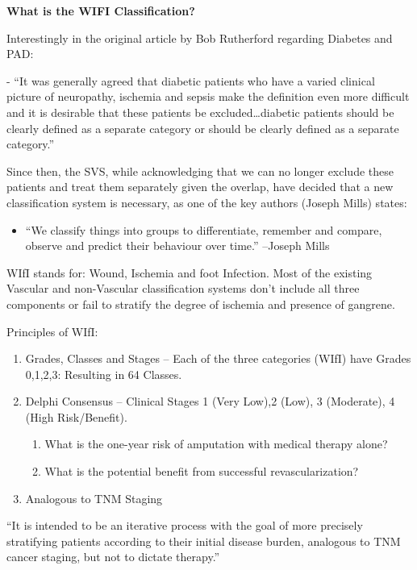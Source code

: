 \documentclass[
]{book}
\providecommand{\tightlist}{%
  \setlength{\itemsep}{0pt}\setlength{\parskip}{0pt}}
\begin{document}
\textbf{What is the WIFI Classification?} \citep{millsSocietyVascularSurgery2014a}

Interestingly in the original article by Bob Rutherford regarding
Diabetes and PAD:

- ``It was generally agreed that diabetic patients who have a varied
clinical picture of neuropathy, ischemia and sepsis make the definition
even more difficult and it is desirable that these patients be
excluded\ldots diabetic patients should be clearly defined as a separate
category or should be clearly defined as a separate category.''

Since then, the SVS, while acknowledging that we can no longer exclude
these patients and treat them separately given the overlap, have decided
that a new classification system is necessary, as one of the key authors
(Joseph Mills) states:

\begin{itemize}
\tightlist
\item
  ``We classify things into groups to differentiate, remember and
  compare, observe and predict their behaviour over time.'' --Joseph
  Mills
\end{itemize}

WIfI stands for: Wound, Ischemia and foot Infection. Most of the
existing Vascular and non-Vascular classification systems don't include
all three components or fail to stratify the degree of ischemia and
presence of gangrene.

Principles of WIfI:

\begin{enumerate}
\def\labelenumi{\arabic{enumi}.}
\item
  Grades, Classes and Stages -- Each of the three categories (WIfI)
  have Grades 0,1,2,3: Resulting in 64 Classes.
\item
  Delphi Consensus -- Clinical Stages 1 (Very Low),2 (Low), 3
  (Moderate), 4 (High Risk/Benefit).

  \begin{enumerate}
  \def\labelenumii{\arabic{enumii}.}
  \item
    What is the one-year risk of amputation with medical therapy
    alone?
  \item
    What is the potential benefit from successful revascularization?
  \end{enumerate}
\item
  Analogous to TNM Staging
\end{enumerate}

``It is intended to be an iterative process with the goal of more
precisely stratifying patients according to their initial disease
burden, analogous to TNM cancer staging, but not to dictate therapy.''
\end{document}
